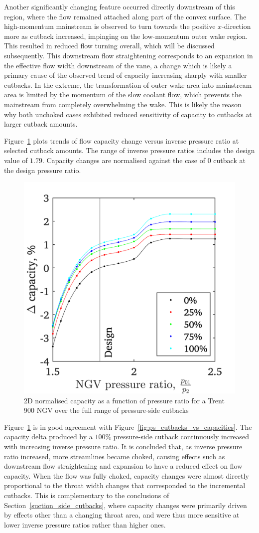 \documentclass[a4paper, 11pt, oneside]{report}
\begin{document}
Another significantly changing feature occurred directly downstream of this region, where the flow remained attached along part of the convex surface. The high-momentum mainstream is observed to turn towards the positive $x$-direction more as cutback increased, impinging on the low-momentum outer wake region. This resulted in reduced flow turning overall, which will be discussed subsequently. This downstream flow straightening corresponds to an expansion in the effective flow width downstream of the vane, a change which is likely a primary cause of the observed trend of capacity increasing sharply with smaller cutbacks. In the extreme, the transformation of outer wake area into mainstream area is limited by the momentum of the slow coolant flow, which prevents the mainstream from completely overwhelming the wake. This is likely the reason why both unchoked cases exhibited reduced sensitivity of capacity to cutbacks at larger cutback amounts.

Figure~\ref{fig:ps_cutbacks_capacities_trends} plots trends of flow capacity change versus inverse pressure ratio at selected cutback amounts. The range of inverse pressure ratios includes the design value of $1.79$. Capacity changes are normalised against the case of $0$ cutback at the design pressure ratio.

\begin{figure}[H]
	\centering
	\includegraphics[width=.45\textwidth]{figs/ps_cutbacks_capacities_trends.png}
	\caption{2D normalised capacity as a function of pressure ratio for a Trent 900 NGV over the full range of pressure-side cutbacks}
    \label{fig:ps_cutbacks_capacities_trends}
\end{figure}

Figure~\ref{fig:ps_cutbacks_capacities_trends} is in good agreement with Figure~\ref{fig:ps_cutbacks_vs_capacities}. The capacity delta produced by a $100\%$ pressure-side cutback continuously increased with increasing inverse pressure ratio. It is concluded that, as inverse pressure ratio increased, more streamlines became choked, causing effects such as downstream flow straightening and expansion to have a reduced effect on flow capacity. When the flow was fully choked, capacity changes were almost directly proportional to the throat width changes that corresponded to the incremental cutbacks. This is complementary to the conclusions of Section~\ref{suction_side_cutbacks}, where capacity changes were primarily driven by effects other than a changing throat area, and were thus more sensitive at lower inverse pressure ratios rather than higher ones. 
\end{document}

